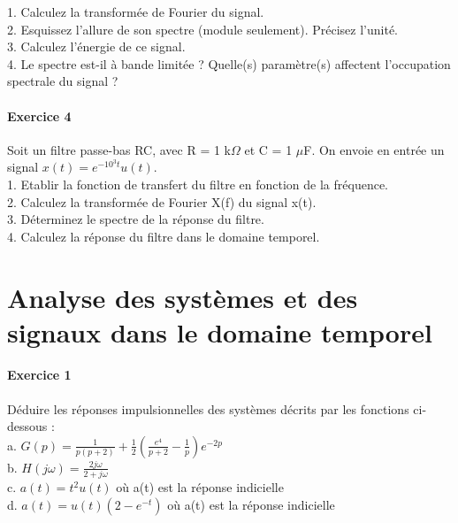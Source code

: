 \documentclass[11pt]{report}
\begin{document}
	1. Calculez la transformée de Fourier du signal.\\
	
	2. Esquissez l'allure de son spectre (module seulement). Précisez l'unité.\\
	
	3. Calculez l'énergie de ce signal.\\
	
	4. Le spectre est-il à bande limitée ? Quelle(s) paramètre(s) affectent l'occupation spectrale du signal ?\\
	
	
	
	\subsubsection{Exercice 4}
	Soit un filtre passe-bas RC, avec R = 1 k$\Omega$ et C = 1 $\mu$F. On envoie en entrée un signal $x(t)=e^{-10^{3}t}u(t)$.\\
	
	1. Etablir la fonction de transfert du filtre en fonction de la fréquence.\\
	
	2. Calculez la transformée de Fourier X(f) du signal x(t).\\
	
	3. Déterminez le spectre de la réponse du filtre.\\
	
	4. Calculez la réponse du filtre dans le domaine temporel.\\
	
	
	
	\newpage
	
	\chapter{Analyse des systèmes et des signaux dans le domaine temporel}
	
	\subsubsection{Exercice 1}
	
	Déduire les réponses impulsionnelles des systèmes décrits par les fonctions ci-dessous :\\
	a. $G(p)=\frac{1}{p(p+2)}+\frac{1}{2}(\frac{e^{4}}{p+2}-\frac{1}{p})e^{-2p}$ \\
	b. $H(j\omega)=\frac{2j\omega}{2+j\omega}$\\
	c. $a(t)=t^{2}u(t)$ où a(t) est la réponse indicielle \\
	d. $a(t)=u(t)(2-e^{-t})$ où a(t) est la réponse indicielle
	
\end{document}
